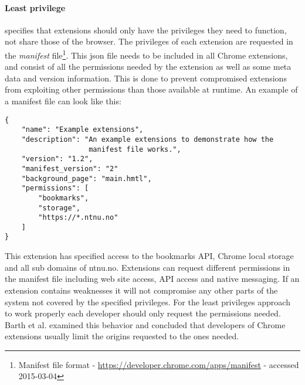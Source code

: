 \paragraph{Least privilege} specifies that extensions should only have the privileges they need to function, not share those of the browser. The privileges of each extension are requested in the \emph{manifest} file\footnote{Manifest file format - \url{https://developer.chrome.com/apps/manifest} - accessed 2015-03-04}. This json file needs to be included in all Chrome extensions, and consist of all the permissions needed by the extension as well as some meta data and version information. This is done to prevent compromised extensions from exploiting other permissions than those available at runtime. An example of a manifest file can look like this: 

\begin{verbatim}
{
    "name": "Example extensions",
    "description": "An example extensions to demonstrate how the
                    manifest file works.",
    "version": "1.2",
    "manifest_version": "2"
    "background_page": "main.hmtl",
    "permissions": [
        "bookmarks",
        "storage",
        "https://*.ntnu.no"
    ]
}
\end{verbatim}
This extension has specified access to the bookmarks API, Chrome local storage and all sub domains of ntnu.no. Extensions can request different permissions in the manifest file including web site access, API access and native messaging. If an extension contains weaknesses it will not compromise any other parts of the system not covered by the specified privileges. For the least privileges approach to work properly each developer should only request the permissions needed. Barth et al. \cite{protecting-browsers} examined this behavior and concluded that developers of Chrome extensions usually limit the origins requested to the ones needed. 

